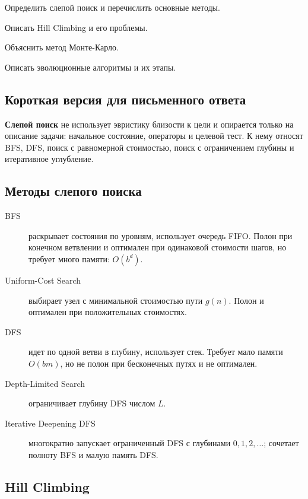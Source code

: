 
\begin{examplan}
    \item Определить слепой поиск и перечислить основные методы.
    \item Описать Hill Climbing и его проблемы.
    \item Объяснить метод Монте-Карло.
    \item Описать эволюционные алгоритмы и их этапы.
\end{examplan}

\subsection*{Короткая версия для письменного ответа}

\textbf{Слепой поиск} не использует эвристику близости к цели и опирается только на описание задачи: начальное состояние, операторы и целевой тест. К нему относят BFS, DFS, поиск с равномерной стоимостью, поиск с ограничением глубины и итеративное углубление.

\subsection*{Методы слепого поиска}

\begin{description}
    \item[BFS] раскрывает состояния по уровням, использует очередь FIFO. Полон при конечном ветвлении и оптимален при одинаковой стоимости шагов, но требует много памяти: $O(b^d)$.
    \item[Uniform-Cost Search] выбирает узел с минимальной стоимостью пути $g(n)$. Полон и оптимален при положительных стоимостях.
    \item[DFS] идет по одной ветви в глубину, использует стек. Требует мало памяти $O(bm)$, но не полон при бесконечных путях и не оптимален.
    \item[Depth-Limited Search] ограничивает глубину DFS числом $L$.
    \item[Iterative Deepening DFS] многократно запускает ограниченный DFS с глубинами $0,1,2,\ldots$; сочетает полноту BFS и малую память DFS.
\end{description}

\subsection*{Hill Climbing}

